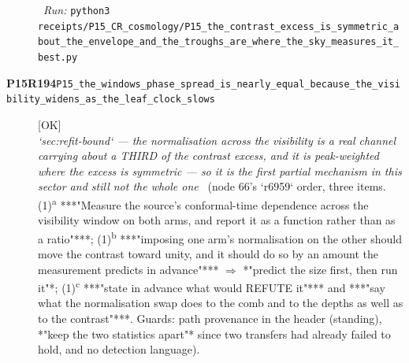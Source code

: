 \begin{description}
\ \emph{Run:} \texttt{python3 receipts/P15\_CR\_cosmology/P15\_the\_contrast\_excess\_is\_symmetric\_about\_the\_envelope\_and\_the\_troughs\_are\_where\_the\_sky\_measures\_it\_best.py}
\item[\rcptlabel{P15_the_windows_phase_spread_is_nearly_equal_because_the_visibility_widens_as_the_leaf_clock_slows}{P15R194}\textbf{P15R194}\quad\texttt{P15\_the\_windows\_phase\_spread\_is\_nearly\_equal\_because\_the\_visibility\_widens\_as\_the\_leaf\_clock\_slows}]\hfill\textsf{[OK]}\\
\textit{`sec:refit-bound` --- the normalisation across the visibility is a real channel carrying about a THIRD of the contrast excess, and it is peak-weighted where the excess is symmetric --- so it is the first partial mechanism in this sector and still not the whole one} \ (node 66's `r6959` order, three items. (1)\textsuperscript{a} ***"Measure the source's conformal-time dependence across the visibility window on both arms, and report it as a function rather than as a ratio"***; (1)\textsuperscript{b} ***"imposing one arm's normalisation on the other should move the contrast toward unity, and it should do so by an amount the measurement predicts in advance"*** \ensuremath{\Rightarrow} *"predict the size first, then run it"*; (1)\textsuperscript{c} ***"state in advance what would REFUTE it"*** and ***"say what the normalisation swap does to the comb and to the depths as well as to the contrast"***.  Guards: path provenance in the header (standing), *"keep the two statistics apart"* since two transfers had already failed to hold, and no detection language). 

\end{description}
